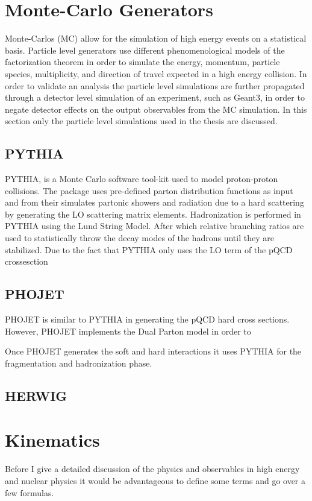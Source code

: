 \section{Monte-Carlo Generators}
Monte-Carlos (MC) allow for the simulation of high energy events on a statistical basis.  Particle level generators use different phenomenological models of the factorization theorem in order to simulate the energy, momentum, particle species, multiplicity, and direction of travel expected in a high energy collision.  In order to validate an analysis the particle level simulations are further propagated through a detector level simulation of an experiment, such as Geant3\cite{Brun:1119728}, in order to negate detector effects on the output observables from the MC simulation.  In this section only the particle level simulations used in the thesis are discussed.

\subsection{PYTHIA}

PYTHIA\cite{Sjostrand:2007gs}, is a Monte Carlo software tool-kit used to model proton-proton collisions.  The package uses pre-defined parton distribution functions as input and from their simulates partonic showers and radiation due to a hard scattering by generating the LO scattering matrix elements.  Hadronization is performed in PYTHIA using the Lund String Model.  After which relative branching ratios are used to statistically throw the decay modes of the hadrons until they are stabilized.  Due to the fact that PYTHIA only uses the LO term of the pQCD crossesction 



\subsection{PHOJET}
PHOJET is similar to PYTHIA in generating the pQCD hard cross sections.  However, PHOJET implements the Dual Parton model\cite{CAPELLA1994225} in order to 

Once PHOJET generates the soft and hard interactions it uses PYTHIA for the fragmentation and hadronization phase.
\subsection{HERWIG}



\section{Kinematics}\label{sec:kinematics}
Before I give a detailed discussion of the physics and observables in high energy and nuclear physics it would be advantageous to define some terms and go over a few formulas.

